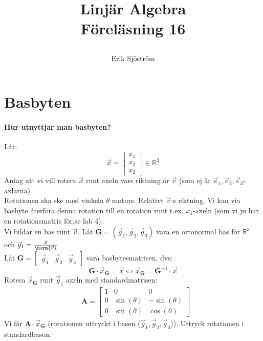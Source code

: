 

\title{
	 Linjär Algebra\\
	 Föreläsning 16
    \author{Erik Sjöström}
}

\maketitle

\section{Basbyten} %
\label{sec:basbyten}
\paragraph{Hur utnyttjar man basbyten?} %
\label{par:hur_utnyttjar_man_basbyten_}
Låt:
\[
\vec{x} = \begin{bmatrix} x_1\\x_2\\x_2 \end{bmatrix} \in \mathbb{R}^3
\]
Antag att vi vill rotera $\vec{x}$ runt axeln vars riktning är $\vec{v}$ (som ej är $\vec{e}_1, \vec{e}_2, \vec{e}_3$-axlarna)\\
Rotationen ska ske med vinkeln $\theta$ moturs. Relativt $\vec{v}$:s riktning.
Vi kan via basbyte återföra denna rotation till en rotation runt t.ex. $x_1$-axeln (som vi ju har en rotationsmatris för,se lab 4).\\
Vi bildar en bas runt $\vec{v}$. Låt $\mathbf{G} = (\vec{g}_1, \vec{g}_2, \vec{g}_3)$ vara en ortonormal bas för $\mathbb{R}^3$ och $\vec{g}_1 = \frac{\vec{v}}{\norm{\vec{v}}}$\\
Låt $\mathbf{G} = \begin{bmatrix} \vec{g}_1&\vec{g}_2&\vec{g}_3 \end{bmatrix}$ vara basbytesmatrisen, dvs:
\[
\mathbf{G} \cdot \vec{x}_{\mathbf{G}} = \vec{x} \Leftrightarrow \vec{x}_{\mathbf{G}} = \mathbf{G}^{-1} \cdot \vec{x}
\]
Rotera $\vec{x}_{\mathbf{G}}$ runt $\vec{g}_1$ axeln med standardmatrisen:
\begin{align*}
&\mathbf{A} = \begin{bmatrix} 1&0&0\\0&\sin(\theta)&-\sin(\theta)\\0&\sin(\theta)&\cos(\theta) \end{bmatrix}
\end{align*}
Vi får $\mathbf{A} \cdot \vec{x}_{\mathbf{G}}$ (rotationen uttryckt i basen ($\vec{g}_1, \vec{g}_2, \vec{g}_3$)). Uttryck rotationen i standardbasen:
